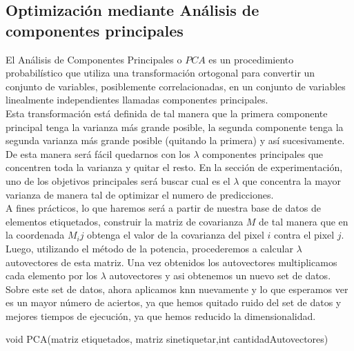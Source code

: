 \subsection{Optimización mediante Análisis de componentes principales}
El Análisis de Componentes Principales o $PCA$ es un procedimiento probabilístico que utiliza una transformación ortogonal para convertir un conjunto de variables, posiblemente correlacionadas, en un conjunto de variables linealmente independientes llamadas componentes principales.
\\
Esta transformación está definida de tal manera que la primera componente principal tenga la varianza más grande posible, la segunda componente tenga la segunda varianza más grande posible (quitando la primera) y así sucesivamente.
\\
De esta manera será fácil quedarnos con los $\lambda$ componentes principales que concentren toda la varianza y quitar el resto. En la sección de experimentación, uno de los objetivos principales será buscar cual es el $\lambda$ que concentra la mayor varianza de manera tal de optimizar el numero de predicciones. 
\\
A fines prácticos, lo que haremos será a partir de nuestra base de datos de elementos etiquetados, construir la matriz de covarianza $M$ de tal manera que en la coordenada $M_ij$ obtenga el valor de la covarianza del pixel $i$ contra el pixel $j$.
\\
Luego, utilizando el método de la potencia, procederemos a calcular $\lambda$ autovectores de esta matriz. Una vez obtenidos los autovectores multiplicamos cada elemento por los $\lambda$ autovectores y asi obtenemos un nuevo set de datos.
\\
Sobre este set de datos, ahora aplicamos knn nuevamente y lo que esperamos ver es un mayor número de aciertos, ya que hemos quitado ruido del set de datos y mejores tiempos de ejecución, ya que hemos reducido la dimensionalidad.
\\

\begin{algorithm}
\begin{algorithmic}[1]\parskip=1mm
\caption{void PCA(matriz etiquetados, matriz sinetiquetar,int cantidadAutovectores)}
\ENDFOR\\
\end{algorithmic}
\end{algorithm}

